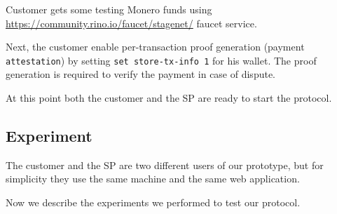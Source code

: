 \documentclass{ieeeaccess}
\begin{document}
Customer gets some testing Monero funds using \url{https://community.rino.io/faucet/stagenet/} faucet service.

Next, the customer enable per-transaction proof generation (payment \texttt{attestation}) by setting \texttt{set store-tx-info 1} for his wallet. The proof generation is required to verify the payment in case of dispute.

At this point both the customer and the SP are ready to start the protocol.

\subsection*{Experiment}

The customer and the SP are two different users of our prototype, but for simplicity they use the same machine and the same web application.

Now we describe the experiments we performed to test our protocol.
\end{document}
